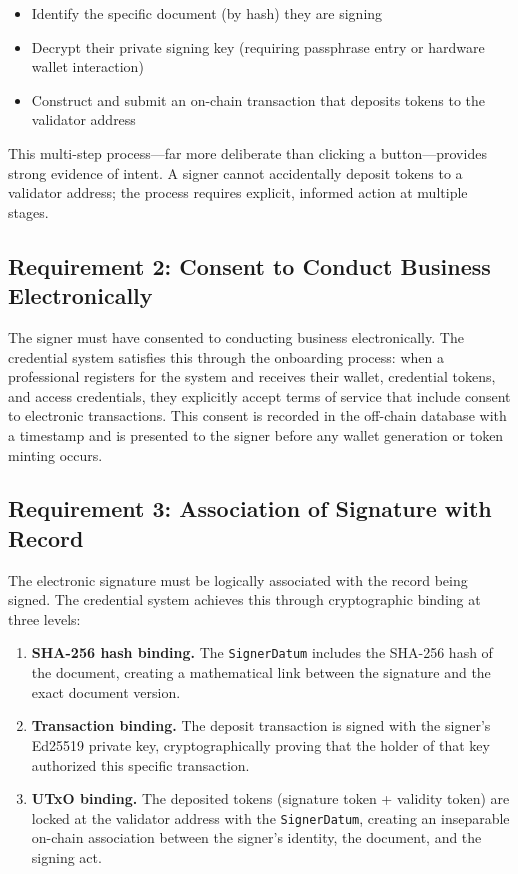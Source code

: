 \begin{itemize}[nosep]
  \item Identify the specific document (by hash) they are signing
  \item Decrypt their private signing key (requiring passphrase entry
    or hardware wallet interaction)
  \item Construct and submit an on-chain transaction that deposits tokens
    to the validator address
\end{itemize}

This multi-step process---far more deliberate than clicking a button---provides
strong evidence of intent.  A signer cannot accidentally deposit tokens to
a validator address; the process requires explicit, informed action at
multiple stages.

\subsection{Requirement 2: Consent to Conduct Business Electronically}

The signer must have consented to conducting business electronically.  The
credential system satisfies this through the onboarding process: when a
professional registers for the system and receives their wallet, credential
tokens, and access credentials, they explicitly accept terms of service that
include consent to electronic transactions.  This consent is recorded in the
off-chain database with a timestamp and is presented to the signer before
any wallet generation or token minting occurs.

\subsection{Requirement 3: Association of Signature with Record}

The electronic signature must be logically associated with the record being
signed.  The credential system achieves this through cryptographic binding
at three levels:

\begin{enumerate}[nosep]
  \item \textbf{SHA-256 hash binding.}  The \texttt{SignerDatum} includes
    the SHA-256 hash of the document, creating a mathematical link between
    the signature and the exact document version.
  \item \textbf{Transaction binding.}  The deposit transaction is signed
    with the signer's Ed25519 private key, cryptographically proving that
    the holder of that key authorized this specific transaction.
  \item \textbf{UTxO binding.}  The deposited tokens (signature token +
    validity token) are locked at the validator address with the
    \texttt{SignerDatum}, creating an inseparable on-chain association
    between the signer's identity, the document, and the signing act.
\end{enumerate}

